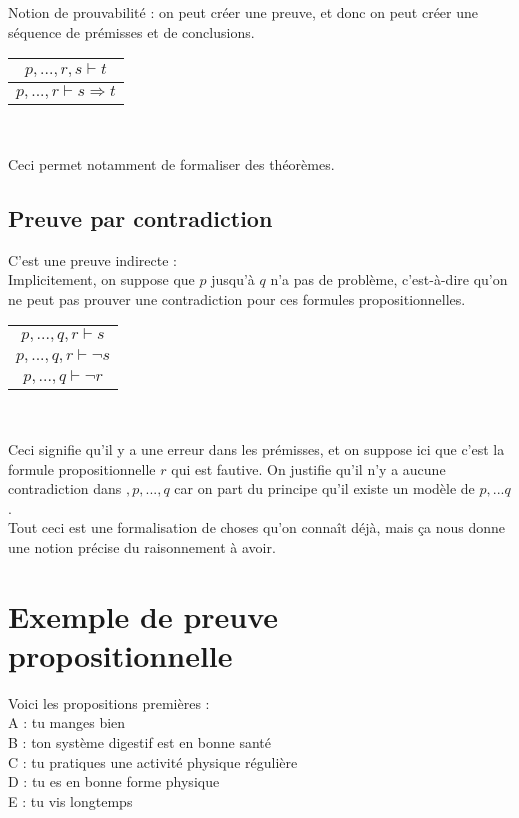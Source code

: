 			Notion de prouvabilité : on peut créer une preuve, et donc on peut créer une séquence de prémisses et de conclusions.
			\begin{center}
			\begin{tabular}{c}
      		$p,...,r,s \vdash t$ \\
      		\hline
      		$p,...,r \vdash s\Rightarrow t$\\
   			\end{tabular}\\
			\end{center}
			Ceci permet notamment de formaliser des théorèmes.
			
		\subsection*{Preuve par contradiction}
		C'est une preuve indirecte :\\
		Implicitement, on suppose que $p$ jusqu'à $q$ n'a pas de problème, c'est-à-dire qu'on ne peut pas prouver une contradiction pour ces formules propositionnelles.
		\begin{center}
			\begin{tabular}{c}
      		$p,...,q,r \vdash s$ \\
      		$p,...,q,r \vdash \lnot s$\\
      		\hline
      		$p,...,q \vdash \lnot r$\\
   			\end{tabular}\\
			\end{center}
			
			Ceci signifie qu'il y a une erreur dans les prémisses, et on suppose ici que c'est la formule propositionnelle $r$ qui est fautive. On justifie qu'il n'y a aucune contradiction dans $,p,...,q$ car on part du principe qu'il existe un modèle de $p,...q$.\\
			
			Tout ceci est une formalisation de choses qu'on connaît déjà, mais ça nous donne une notion précise du raisonnement à avoir.
			
\section{Exemple de preuve propositionnelle}

\noindent Voici les propositions premières : \\
A : tu manges bien \\
B : ton système digestif est en bonne santé \\
C : tu pratiques une activité physique régulière \\
D : tu es en bonne forme physique \\
E : tu vis longtemps \\

